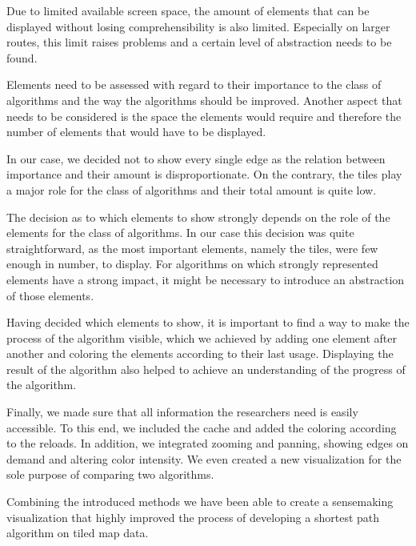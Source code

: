 \documentclass
[
    paper = a4,
    pagesize,
    12 pt,
    twoside,                       %
    open = right,
    DIV = calc,
    BCOR = 0 mm,                   %
    bibtotoc
]
{scrbook}
\begin{document}
Due to limited available screen space, the amount of elements that can be displayed without losing comprehensibility is also limited.
Especially on larger routes, this limit raises problems and a certain level of abstraction needs to be found.

Elements need to be assessed with regard to their importance to the class of algorithms and the way the algorithms should be improved.
Another aspect that needs to be considered is the space the elements would require and therefore the number of elements that would have to be displayed.

In our case, we decided not to show every single edge as the relation between importance and their amount is disproportionate.
On the contrary, the tiles play a major role for the class of algorithms and their total amount is quite low.

The decision as to which elements to show strongly depends on the role of the elements for the class of algorithms.
In our case this decision was quite straightforward, as the most important elements, namely the tiles, were few enough in number, to display.
For algorithms on which strongly represented elements have a strong impact, it might be necessary to introduce an abstraction of those elements.

Having decided which elements to show, it is important to find a way to make the process of the algorithm visible, which we achieved by adding one element after another and coloring the elements according to their last usage.
Displaying the result of the algorithm also helped to achieve an understanding of the progress of the algorithm.

Finally, we made sure that all information the researchers need is easily accessible.
To this end, we included the cache and added the coloring according to the reloads.
In addition, we integrated zooming and panning, showing edges on demand and altering color intensity.
We even created a new visualization for the sole purpose of comparing two algorithms.

Combining the introduced methods we have been able to create a sensemaking visualization that highly improved the process of developing a shortest path algorithm on tiled map data.


%
\end{document}
